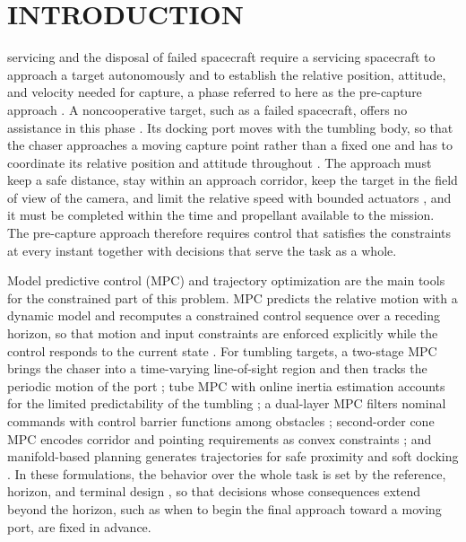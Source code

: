 \section{INTRODUCTION}\label{sec:intro}

 servicing and the disposal of failed spacecraft require a servicing spacecraft to approach a target autonomously and to establish the relative position, attitude, and velocity needed for capture, a phase referred to here as the pre-capture approach \cite{tian2024taes,lian2026asr}. A noncooperative target, such as a failed spacecraft, offers no assistance in this phase \cite{xu2026ast}. Its docking port moves with the tumbling body, so that the chaser approaches a moving capture point rather than a fixed one and has to coordinate its relative position and attitude throughout \cite{dong2025aa}. The approach must keep a safe distance, stay within an approach corridor, keep the target in the field of view of the camera, and limit the relative speed with bounded actuators \cite{lian2026asr}, and it must be completed within the time and propellant available to the mission. The pre-capture approach therefore requires control that satisfies the constraints at every instant together with decisions that serve the task as a whole.

Model predictive control (MPC) and trajectory optimization are the main tools for the constrained part of this problem. MPC predicts the relative motion with a dynamic model and recomputes a constrained control sequence over a receding horizon, so that motion and input constraints are enforced explicitly while the control responds to the current state \cite{gong2026ast}. For tumbling targets, a two-stage MPC brings the chaser into a time-varying line-of-sight region and then tracks the periodic motion of the port \cite{dong2022aa}; tube MPC with online inertia estimation accounts for the limited predictability of the tumbling \cite{dong2024asr}; a dual-layer MPC filters nominal commands with control barrier functions among obstacles \cite{xu2026ast}; second-order cone MPC encodes corridor and pointing requirements as convex constraints \cite{lian2026asr}; and manifold-based planning generates trajectories for safe proximity and soft docking \cite{wang2026ast}. In these formulations, the behavior over the whole task is set by the reference, horizon, and terminal design \cite{xu2026ast}, so that decisions whose consequences extend beyond the horizon, such as when to begin the final approach toward a moving port, are fixed in advance.

